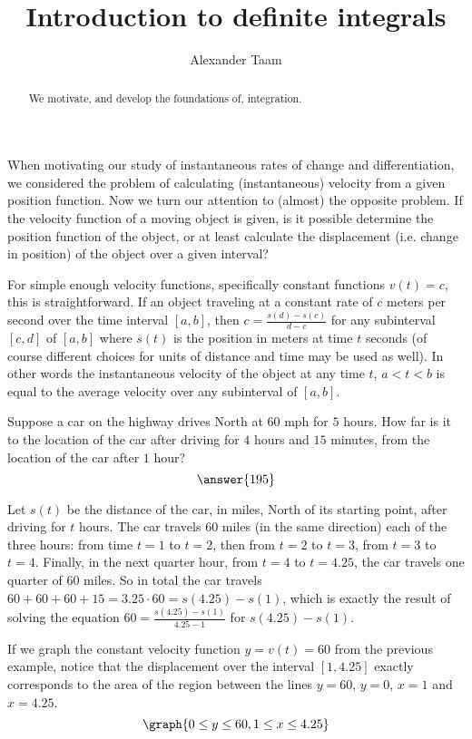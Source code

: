 \documentclass{ximera}
\title{Introduction to definite integrals}
\author{Alexander Taam}
\begin{document}
\begin{abstract}
  We motivate, and develop the foundations of, integration.
\end{abstract}
\maketitle

When motivating our study of instantaneous rates of change and differentiation, we considered the problem of calculating (instantaneous) velocity from a given position function. Now we turn our attention to (almost) the opposite problem. If the velocity function of a moving object is given, is it possible determine the position function of the object, or at least calculate the displacement (i.e. change in position) of the object over a given interval?

For simple enough velocity functions, specifically constant functions $v(t)=c$, this is straightforward. If an object traveling at a constant rate of $c$ meters per second over the time interval $[a,b]$, then $c=\frac{s(d)-s(c)}{d-c}$ for any subinterval $[c,d]$ of $[a,b]$ where $s(t)$ is the position in meters at time $t$ seconds (of course different choices for units of distance and time may be used as well). In other words the instantaneous velocity of the object at any time $t$, $a<t<b$ is equal to the average velocity over any subinterval of $[a,b]$.

\begin{example}
Suppose a car on the highway drives North at $60$ mph for $5$ hours. How far is it to the location of the car after driving for $4$ hours and $15$ minutes, from the location of the car after $1$ hour? \[\answer{195}\]

\begin{feedback} Let $s(t)$ be the distance of the car, in miles, North of its starting point, after driving for $t$ hours. The car travels $60$ miles (in the same direction) each of the three hours: from time $t=1$ to $t=2$, then from $t=2$ to $t=3$, from $t=3$ to $t=4$. Finally, in the next quarter hour, from $t=4$ to $t=4.25$, the car travels one quarter of $60$ miles. So in total the car travels $60+60+60+15=3.25\cdot60=s(4.25)-s(1)$, which is exactly the result of solving the equation $60=\frac{s(4.25)-s(1)}{4.25-1}$ for $s(4.25)-s(1)$.
\end{feedback}
\end{example}

If we graph the constant velocity function $y=v(t)=60$ from the previous example, notice that the displacement over the interval $[1,4.25]$ exactly corresponds to the area of the region between the lines $y=60$, $y=0$, $x=1$ and $x=4.25$.
\[
\graph{0\leq y\leq 60,1\leq x\leq 4.25}
\]
\end{document}
